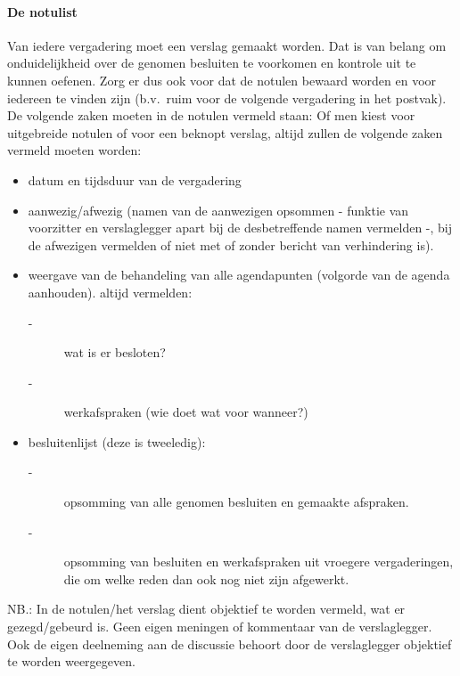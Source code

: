 \paragraph{De notulist} 
Van iedere vergadering moet een verslag gemaakt worden. Dat is
van belang om onduidelijkheid over de genomen besluiten te
voorkomen en kontrole uit te kunnen oefenen. Zorg er dus ook
voor dat de notulen bewaard worden en voor iedereen te vinden
zijn (b.v.\ ruim voor de volgende vergadering in het postvak).
De volgende zaken moeten in de notulen vermeld staan:
Of men kiest voor uitgebreide notulen of voor een beknopt
verslag, altijd zullen de volgende zaken vermeld moeten worden:
\begin{itemize}

\item    datum en tijdsduur van de vergadering
\item    aanwezig/afwezig (namen van de aanwezigen opsommen -
     funktie van voorzitter en verslaglegger apart bij de
     desbetreffende namen vermelden -, bij de afwezigen vermelden of niet met of zonder bericht van verhindering
     is).
\item    weergave van de behandeling van alle agendapunten (volgorde van de agenda aanhouden).
     altijd vermelden:
\begin{description} 
  \item[-] wat is er besloten?
                         \item[-] werkafspraken (wie doet wat voor     
                          wanneer?)
\end{description}
\item    besluitenlijst (deze is tweeledig):
\begin{description}
               \item[-]    opsomming van alle genomen besluiten en
                    gemaakte afspraken.
               \item[-]    opsomming van besluiten en werkafspraken
                    uit vroegere vergaderingen,\\
		    die om welke reden dan ook nog niet zijn afgewerkt.
\end{description}
\end{itemize}
NB.: In de notulen/het verslag dient objektief te worden
vermeld, wat er gezegd/gebeurd is. Geen eigen meningen of
kommentaar van de verslaglegger. Ook de eigen deelneming aan
de discussie behoort door de verslaglegger objektief te worden
weergegeven.


